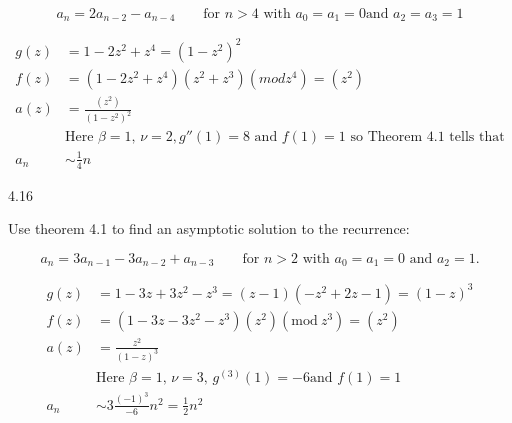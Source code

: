 \documentclass[12pt]{article}
\begin{document}
\[
a_n = 2a_{n - 2} - a_{n - 4} \qquad \text{for $n > 4$ with $a_0 = a_1 = 0$
    and $a_2 = a_3 = 1$}
\]

\[
\begin{split}
g(z) & = 1 - 2z^2 + z^4 = (1 - z^2)^2 \\
f(z) & = (1 - 2z^2 + z^4)(z^2 + z^3)(mod z^4) = (z^2) \\
a(z) & = \frac{(z^2)}{(1 - z^2)^2}\\
& \text{Here $\beta = 1$, $\nu = 2, g''(1) = 8$ and $f(1) = 1$ so Theorem 4.1 tells that} \\
a_n & \sim \frac{1}{4}n
\end{split}
\]

4.16

Use theorem 4.1 to find an asymptotic solution to the recurrence:

\[
a_n = 3a_{n - 1} - 3a_{n - 2} + a_{n - 3} \qquad
\text{for $n > 2$ with $a_0 = a_1 = 0$ and $a_2 = 1$.}
\]

\[
\begin{split}
g(z) & = 1 - 3z + 3z^2 - z^3 = (z - 1)(-z^2 + 2z - 1) = (1 - z)^3 \\
f(z) & = (1 - 3z - 3z^2 - z^3)(z^2)(\text{mod}\ z^3) = (z^2) \\
a(z) & = \frac{z^2}{(1 - z)^3} \\
& \text{Here $\beta = 1$, $\nu = 3$, $g^{(3)}(1) = -6$
    and $f(1) = 1$}\\
a_n & \sim 3\frac{(-1)^3}{-6}n^2 = \frac{1}{2}n^2
\end{split}
\]
\end{document}
